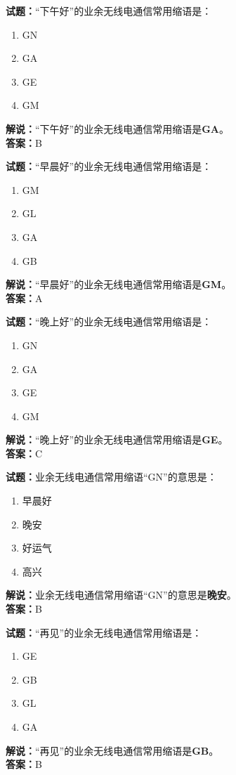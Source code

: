 \documentclass{ctexbook}
\begin{document}
\bigskip


\noindent\textbf{试题：}“下午好”的业余无线电通信常用缩语是：
\begin{enumerate}[leftmargin=3em]
\item GN
\item GA
\item GE
\item GM
\end{enumerate}
\noindent\textbf{解说：}“下午好”的业余无线电通信常用缩语是\textbf{GA}。\\\noindent\textbf{答案：}B

\bigskip


\noindent\textbf{试题：}“早晨好”的业余无线电通信常用缩语是：
\begin{enumerate}[leftmargin=3em]
\item GM
\item GL
\item GA
\item GB
\end{enumerate}
\noindent\textbf{解说：}“早晨好”的业余无线电通信常用缩语是\textbf{GM}。\\\noindent\textbf{答案：}A


\bigskip


\noindent\textbf{试题：}“晚上好”的业余无线电通信常用缩语是：
\begin{enumerate}[leftmargin=3em]
\item GN
\item GA
\item GE
\item GM
\end{enumerate}
\noindent\textbf{解说：}“晚上好”的业余无线电通信常用缩语是\textbf{GE}。\\\noindent\textbf{答案：}C



\bigskip


\noindent\textbf{试题：}业余无线电通信常用缩语“GN”的意思是：
\begin{enumerate}[leftmargin=3em]
\item 早晨好
\item 晚安
\item 好运气
\item 高兴
\end{enumerate}
\noindent\textbf{解说：}业余无线电通信常用缩语“GN”的意思是\textbf{晚安}。\\\noindent\textbf{答案：}B

\bigskip


\noindent\textbf{试题：}“再见”的业余无线电通信常用缩语是：
\begin{enumerate}[leftmargin=3em]
\item GE
\item GB
\item GL
\item GA
\end{enumerate}
\noindent\textbf{解说：}“再见”的业余无线电通信常用缩语是\textbf{GB}。\\\noindent\textbf{答案：}B
\end{document}
